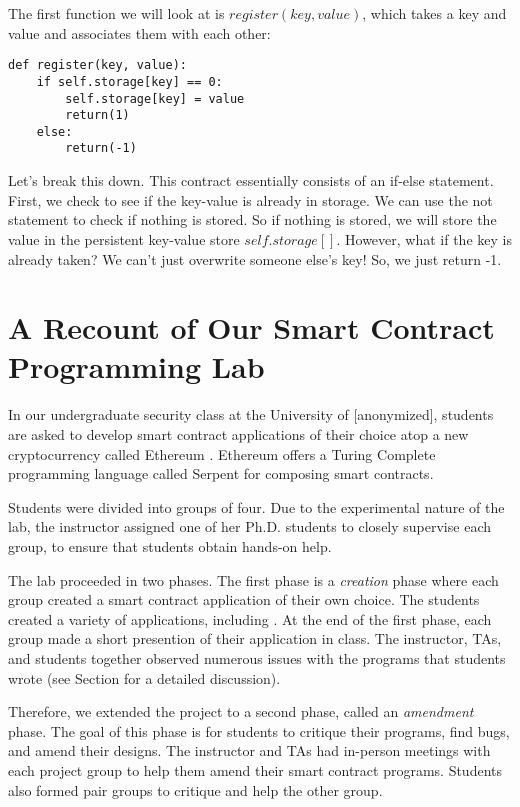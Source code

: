 \documentclass[10pt,twocolumn,letterpaper]{article}
\newcommand{\elaine}[1]{{\color{red}{[elaine: #1]}}}
\begin{document}
The first function we will look at is $register(key, value)$, which takes a key and value and associates them with each other:

\begin{mdframed}
\begin{verbatim}
def register(key, value):
	if self.storage[key] == 0:
		self.storage[key] = value
		return(1)
	else:
		return(-1)
\end{verbatim}
\end{mdframed}

Let's break this down. This contract essentially consists of an if-else statement. First, we check to see if the key-value is already in storage. We can use the not statement to check if nothing is stored. So if nothing is stored, we will store the value in the persistent key-value store $self.storage[]$. However, what if the key is already taken? We can't just overwrite someone else's key! So, we just return -1. 

\section{A Recount of Our Smart Contract Programming Lab}
In our undergraduate security class at the University of [anonymized], 
students are asked to develop smart contract applications of their choice
atop a new cryptocurrency called Ethereum \elaine{cite}.
Ethereum offers a Turing Complete programming language
called Serpent \elaine{cite} for composing smart contracts. 

Students were divided into groups of four.  
Due to the experimental nature of the lab, 
the instructor assigned one of her Ph.D. students 
to closely supervise each group, to ensure that students
obtain hands-on help.

The lab proceeded in two phases. 
The first phase is a 
{\it creation} phase where each group created a 
smart contract application
of their own choice.
The students created a variety of applications, including
\elaine{give a laundry list}.
At the end of the first phase, each group 
made a short presention of their 
application in class.
The instructor, TAs, and students together observed numerous issues  
with the programs that students 
wrote (see Section \elaine{refer} for a detailed
discussion). 

Therefore, we extended the project to a second phase, called 
an {\it amendment} phase. 
The goal of this phase is for students to critique their programs,
find bugs, and amend their designs. 
The instructor and TAs had in-person meetings with each project group
to help them amend their smart contract programs.  
Students also formed pair groups to critique and 
help the other group. 
\end{document}
